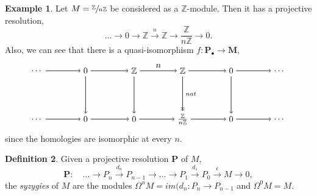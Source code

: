 \documentclass[11.5pt, twoside, a4paper, titlepage]{report}
\providecommand{\bb}[1]{\mathbb{#1}}
\theoremstyle{definition}
\newtheorem{mydef}{Definition}[section]
\newtheorem{eg}[mydef]{Example}
\theoremstyle{plain}
\begin{document}
\begin{eg}
Let $M=\sfrac{\bb{Z}}{n\bb{Z}}$ be considered as a $\bb{Z}$-module. Then it has a projective resolution,
\begin{equation*}
\dots \xrightarrow{} 0 \xrightarrow{}\bb{Z} \xrightarrow{n} \bb{Z} \xrightarrow{} \frac{\bb{Z}}{n\bb{Z}} \xrightarrow{} 0.
\end{equation*}
Also, we can see that there is a quasi-isomorphism $f: \mathbf{P}_{\bullet} \to \mathbf{M}$, 
\begin{equation*}
\begin{tikzpicture}[->,-latex, auto, main path/.style={->, semithick}, main node/.style={}]
\node	[main node]		(2) at (2,0)		{$\dots$};
\node	[main node]		(3) at (4,0)		{$0$};
\node [main node]		(4) at (6,0)		{$\bb{Z}$};
\node [main node]		(5) at (8,0)		{$\bb{Z}$};
\node	[main node]		(11) at (10,0)	{$0$};
\node [main node] 		(12) at (12,0)	{$\dots$};

\node	[main node]		(7) at (2,-2)		{$\dots$};
\node	[main node]		(8) at (4,-2)		{$0$};
\node [main node]		(9) at (6,-2)		{$0$};
\node [main node]		(10) at (8,-2)	{$\frac{\bb{Z}}{n\bb{Z}}$};
\node [main node]		(13) at (10,-2)	{$0$};
\node [main node]		(14) at (12, -2)	{$\dots$};

\draw (2) edge [main path] node [auto] {$$} (3);
\draw (3) edge [main path] node [auto] {$$} (4);
\draw (4) edge [main path] node [auto] {$n$} (5);
\draw (5) edge [main path] (11);
\draw (11) edge [main path] (12);

\draw (7) edge [main path] node [auto] {$$} (8);
\path (8) edge [main path] node [auto] {$$} (9);
\draw (9) edge [main path] node [auto, swap] {$$} (10);
\draw (10) edge [main path] (13);
\draw (13) edge [main path] (14);

\draw (3) edge [main path] node [auto] {$$} (8);
\draw (4) edge [main path] node [auto] {$$} (9);
\draw (5) edge [->>, semithick] node [auto] {$\scriptstyle{nat}$} (10);
\draw (11) edge [main path] (13);
\end{tikzpicture}
\end{equation*}
since the homologies are isomorphic at every $n$.
\end{eg}

\begin{mydef} \label{syzygiesdef}
Given a projective resolution $\mathbf{P}$ of $M$,
\begin{equation*}
\mathbf{P}:\quad \dots \xrightarrow{} P_n \xrightarrow{d_n} P_{n-1} \xrightarrow{} \dots \xrightarrow{} P_1 \xrightarrow{d_1} P_0 \xrightarrow{\epsilon} M \xrightarrow{} 0,
\end{equation*}
the \emph{syzygies} of $M$ are the modules $\Omega^nM=im(d_n:P_n \to P_{n-1}$ and $\Omega^0M=M$.\\
\end{mydef}
\end{document}
